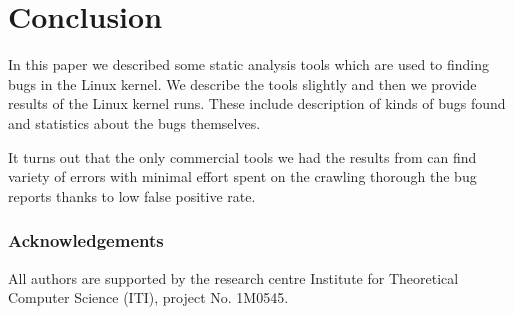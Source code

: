 \documentclass[10pt]{llncs}
\begin{document}
\section{Conclusion}
\label{sec:conclusion}
In this paper we described some static analysis tools which are used to
finding bugs in the Linux kernel. We describe the tools slightly and then we
provide results of the Linux kernel runs. These include description of kinds
of bugs found and statistics about the bugs themselves.

It turns out that the only commercial tools we had the results from can find
variety of errors with minimal effort spent on the crawling thorough the bug
reports thanks to low false positive rate.

\subsubsection{Acknowledgements}
\label{sec:acknowledgements}

All authors are supported by the research centre Institute for Theoretical
Computer Science (ITI), project No. 1M0545.



\end{document}
